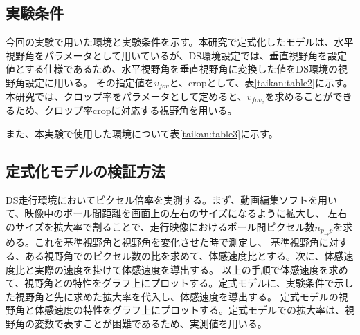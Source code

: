\subsection{実験条件}
今回の実験で用いた環境と実験条件を示す。本研究で定式化したモデルは、水平視野角をパラメータとして用いているが、DS環境設定では、垂直視野角を設定値とする仕様であるため、水平視野角を垂直視野角に変換した値をDS環境の視野角設定に用いる。
その指定値を$v_{fov}$と、cropとして、表\ref{taikan:table2}に示す。本研究では、クロップ率をパラメータとして定めると、$v_{fov_v}$を求めることができるため、クロップ率cropに対応する視野角を用いる。

\begin{table}[h]
  \centering
  \caption{水平視野角の指定値$v_{fov}$とクロップ率cropとの対応}
\end{table}%

また、本実験で使用した環境について表\ref{taikan:table3}に示す。

\begin{table}[h]
  \centering
  \caption{本研究で使用した環境}
\end{table}

\subsection{定式化モデルの検証方法}
DS走行環境においてピクセル倍率を実測する。まず、動画編集ソフトを用いて、映像中のポール間距離を画面上の左右のサイズになるように拡大し、
左右のサイズを拡大率で割ることで、走行映像におけるポール間ピクセル数$n_{p_{\to}p}$を求める。これを基準視野角と視野角を変化させた時で測定し、
基準視野角に対する、ある視野角でのピクセル数の比を求めて、体感速度比とする。次に、体感速度比と実際の速度を掛けて体感速度を導出する。
以上の手順で体感速度を求めて、視野角との特性をグラフ上にプロットする。定式モデルに、実験条件で示した視野角と先に求めた拡大率を代入し、体感速度を導出する。
定式モデルの視野角と体感速度の特性をグラフ上にプロットする。定式モデルでの拡大率は、視野角の変数で表すことが困難であるため、実測値を用いる。

